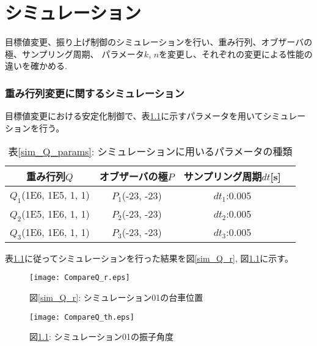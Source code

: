 \chapter{シミュレーション}
目標値変更、振り上げ制御のシミュレーションを行い、重み行列、オブザーバの極、サンプリング周期、
パラメータ$k$, $n$を変更し、それぞれの変更による性能の違いを確かめる.

\subsection{重み行列変更に関するシミュレーション}
目標値変更における安定化制御で、表\ref{sim_Q}に示すパラメータを用いてシミュレーションを行う。

\begin{table}[htbp]
    \begin{center}
        \caption{表\ref{sim_Q_params}: シミュレーションに用いるパラメータの種類}
        \begin{tabular}{|c|c|c|c|} \hline
            重み行列$Q$ & オブザーバの極$P$ & サンプリング周期$dt$[s] \\ \hline \hline
            $Q_1$(1E6, 1E5, 1, 1) & $P_1$(-23, -23) & $dt_1$:0.005 \\ \hline
            $Q_2$(1E5, 1E6, 1, 1) & $P_2$(-23, -23) & $dt_2$:0.005 \\ \hline
            $Q_3$(1E6, 1E6, 1, 1) & $P_3$(-23, -23) & $dt_3$:0.005 \\ \hline
        \end{tabular}
        \label{sim_Q}
    \end{center}
\end{table}

表\ref{sim_Q}に従ってシミュレーションを行った結果を図\ref{sim_Q_r}, 図\ref{sim_Q_th}に示す。

\begin{figure}[htbp]
    \begin{minipage}{0.5\hsize}
        \begin{center}
            \texttt{[image: CompareQ\_r.eps]}
            \caption{図\ref{sim_Q_r}: シミュレーション01の台車位置}
            \label{sim_Q_r}
        \end{center}
    \end{minipage}
    \begin{minipage}{0.5\hsize}
        \begin{center}
            \texttt{[image: CompareQ\_th.eps]}
            \caption{図\ref{sim_Q_th}: シミュレーション01の振子角度}
            \label{sim_Q_th}
        \end{center}
    \end{minipage}
\end{figure}

